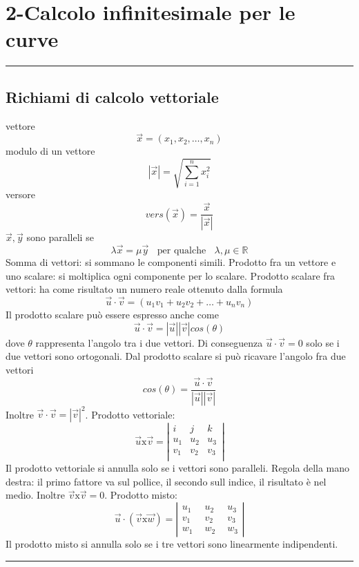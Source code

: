 \section*{2-Calcolo infinitesimale per le curve}
\rule{\textwidth}{2pt}
\subsection*{Richiami di calcolo vettoriale}
vettore
\[
    \vec{x} = (x_1, x_2, \dots, x_n)
\]
modulo di un vettore
\[
    |\vec{x}| = \sqrt{\sum_{i=1}^{n}x_i^2}
\]
versore
\[
    vers(\vec{x}) = \frac{\vec{x}}{|\vec{x}|}
\]
$\vec{x}, \vec{y}$ sono paralleli se
\[
    \lambda \vec{x} = \mu \vec{y}\;\; \text{ per qualche } \;\;\lambda, \mu \in \mathbb{R}
\]
Somma di vettori: si sommano le componenti simili.\newline
Prodotto fra un vettore e uno scalare: si moltiplica ogni componente per lo scalare.\newline
Prodotto scalare fra vettori: ha come risultato un numero reale ottenuto dalla formula
\[
    \vec{u} \cdot \vec{v} = (u_1 v_1 + u_2 v_2 + \dots + u_n v_n)
\]
Il prodotto scalare può essere espresso anche come
\[
    \vec{u} \cdot \vec{v} = |\vec{u}| |\vec{v}| cos(\theta)
\]
dove $\theta$ rappresenta l'angolo tra i due vettori. Di conseguenza $\vec{u} \cdot  \vec{v} = 0$ solo se i due vettori sono ortogonali.\newline
Dal prodotto scalare si può ricavare l'angolo fra due vettori
\[
    cos(\theta) = \frac{\vec{u} \cdot  \vec{v} }{|\vec{u}| |\vec{v}|}
\]
Inoltre $\vec{v} \cdot  \vec{v} = |\vec{v}|^2$.\newline
Prodotto vettoriale:
\[
    \vec{u}\text{x}\vec{v} = \left|\begin{matrix}
        i \;\; & j \;\;& k \;\;\\
        u_1 & u_2 & u_3\\
        v_1 & v_2 & v_3\\
    \end{matrix}\right|
\]
Il prodotto vettoriale si annulla solo se i vettori sono paralleli.\newline
Regola della mano destra: il primo fattore va sul pollice, il secondo sull indice, il risultato è nel medio.\newline
Inoltre $\vec{v} \text{x} \vec{v} = 0$.\newline
Prodotto misto:
\[
    \vec{u} \cdot (\vec{v} \text{x} \vec{w}) = \left|\begin{matrix}
        u_1 \;\;& u_2 \;\;& u_3\\
        v_1 &v_2 & v_3\\
        w_1 &w_2 & w_3
    \end{matrix}\right|
\]
Il prodotto misto si annulla solo se i tre vettori sono linearmente indipendenti.\newline
\rule{\textwidth}{2pt}
